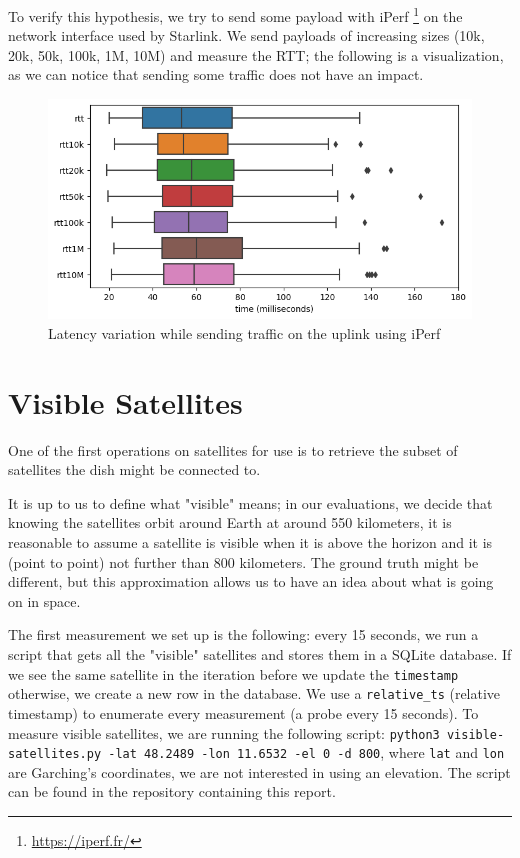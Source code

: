 \documentclass[IN,11pt,twoside,openright,idp,english]{tumthesis}
\begin{document}
To verify this hypothesis, we try to send some payload with iPerf \footnote{\url{https://iperf.fr/}} on the network interface used by Starlink. We send payloads of increasing sizes (10k, 20k, 50k, 100k, 1M, 10M) and measure the RTT; the following is a visualization, as we can notice that sending some traffic does not have an impact.

\begin{figure}
    \centering
    \includegraphics[width=0.6\columnwidth]{img/latency_iperf.png}
    \caption{Latency variation while sending traffic on the uplink using iPerf}
\end{figure}

\section{Visible Satellites}
One of the first operations on satellites for use is to retrieve the subset of satellites the dish might be connected to.

It is up to us to define what "visible" means; in our evaluations, we decide that knowing the satellites orbit around Earth at around 550 kilometers, it is reasonable to assume a satellite is visible when it is above the horizon and it is (point to point) not further than 800 kilometers. The ground truth might be different, but this approximation allows us to have an idea about what is going on in space. 

The first measurement we set up is the following: every 15 seconds, we run a script that gets all the "visible" satellites and stores them in a SQLite database. If we see the same satellite in the iteration before we update the \texttt{timestamp} otherwise, we create a new row in the database. We use a \texttt{relative\_ts} (relative timestamp) to enumerate every measurement (a probe every 15 seconds). To measure visible satellites, we are running the following script: \texttt{python3 visible-satellites.py -lat 48.2489 -lon 11.6532 -el 0 -d 800}, where \texttt{lat} and \texttt{lon} are Garching's coordinates, we are not interested in using an elevation. The script can be found in the repository containing this report.
\end{document}
